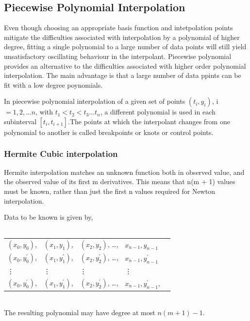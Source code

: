\documentclass[12pt]{article}
\begin{document}
\subsection{Piecewise Polynomial Interpolation}
Even though choosing an appropriate basis function and intetpolation points mitigate the difficulties associated with interpolation by a polynomial of higher degree, fitting a single polynomial to a large number of data points will still yield unsatisfactory oscillating behaviour in the interpolant. 
Piecewise polynomial provides an alternative to the difficulties associated with higher order polynomial interpolation. The main advantage is that a large number of data ppints can be fit with a low degree poynomials.

In piecewise polynomial interpolation of a given set of points $(t_i,y_i)$, i $=1,2,...n$, with $t_1 < t_2 < t_3 ...t_n$, a different polynomial is used in each subinterval $[t_i, t_{i+1}]$.The points at which the interpolant changes from one polynomial to another is called breakpoints or knots or control points.

\subsubsection{Hermite Cubic interpolation}
Hermite interpolation matches an unknown function both in observed value, and the observed value of its first m derivatives. This means that n(m + 1) values must be known, rather than just the first n values required for Newton interpolation.

Data to be known is given by, \\
~\newline

\renewcommand{\arraystretch}{1.2}
\noindent
 \begin{tabular}{l l l l l} 
	\toprule		
	\midrule 
	 $(x_0,y_0)$,& $(x_1,y_1)$, & $(x_2,y_2)$, \dots, & $x_{n-1}, y_{n-1}$\\
	 $(x_0,y_0 ^{'})$,& $(x_1,y_1 ^{'})$, & $(x_2,y_2 ^{'})$, \dots, & $x_{n-1}, y_{n-1} ^{'}$\\
	 \vdots & \vdots & \vdots & \vdots \\
	 $(x_0,y_0 ^{'})$,& $(x_1,y_1 ^{'})$, & $(x_2,y_2 ^{'})$, \dots, & $x_{n-1}, y_{n-1} ^{'}$,\\
	\bottomrule
\end{tabular}
\\
The resulting polynomial may have degree at most $n(m + 1)-1$.
\end{document}
